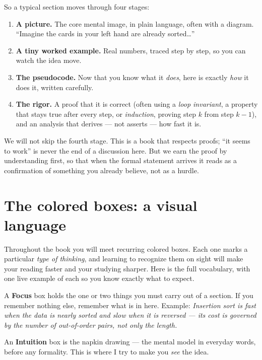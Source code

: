 So a typical section moves through four stages:

\begin{enumerate}
  \item \textbf{A picture.} The core mental image, in plain language, often with
        a diagram. ``Imagine the cards in your left hand are already sorted\dots''
  \item \textbf{A tiny worked example.} Real numbers, traced step by step, so you
        can watch the idea move.
  \item \textbf{The pseudocode.} Now that you know what it \emph{does}, here is
        exactly \emph{how} it does it, written carefully.
  \item \textbf{The rigor.} A proof that it is correct (often using a \emph{loop invariant}, a property that stays true after every step, or \emph{induction}, proving step $k$ from step $k-1$), and an analysis that derives --- not asserts --- how fast it is.
\end{enumerate}

We will not skip the fourth stage. This is a book that respects proofs; ``it
seems to work'' is never the end of a discussion here. But we earn the proof by
understanding first, so that when the formal statement arrives it reads as a
confirmation of something you already believe, not as a hurdle.

\section*{The colored boxes: a visual language}

Throughout the book you will meet recurring colored boxes. Each one marks a
particular \emph{type of thinking}, and learning to recognize them
on sight will make your reading faster and your studying sharper. Here is the
full vocabulary, with one live example of each so you know exactly what to expect.

\begin{focusbox}
A \textbf{Focus} box holds the one or two things you must carry out of a section.
If you remember nothing else, remember what is in here. Example: \emph{Insertion
sort is fast when the data is nearly sorted and slow when it is reversed --- its
cost is governed by the number of out-of-order pairs, not only the length.}
\end{focusbox}

\begin{intuitionbox}
An \textbf{Intuition} box is the napkin drawing --- the mental model in everyday
words, before any formality. This is where I try to make you \emph{see} the idea.
\end{intuitionbox}

